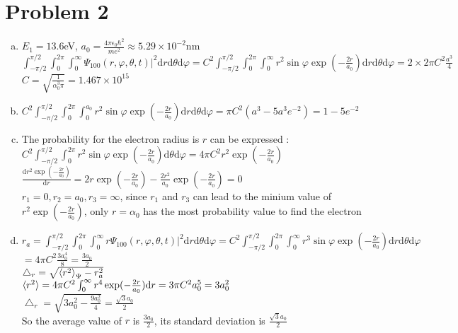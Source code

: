 \documentclass[a4paper]{article}
\begin{document}
\section{Problem 2}
\begin{enumerate}[(a)]
    \item $E_1=13.6$eV, $a_0=\frac{4\pi\epsilon_0\hbar^2}{me^2}\approx5.29\times10^{-2}$nm
    \\$\int_{-\pi/2}^{\pi/2}\int_0^{2\pi}\int_0^\infty\Psi_{100}(r,\varphi,\theta,t)|^2\mathrm{d}r\mathrm{d}\theta\mathrm{d}\varphi=C^2\int_{-\pi/2}^{\pi/2}\int_0^{2\pi}\int_0^\infty r^2\sin\varphi\exp(-\frac{2r}{a_0})\mathrm{d}r\mathrm{d}\theta\mathrm{d}\varphi=2\times2\pi C^2\frac{a^3}{4}$
    \\$C=\sqrt{\frac{1}{\alpha_0^3\pi}}=1.467\times10^{15}$
    \item $C^2\int_{-\pi/2}^{\pi/2}\int_0^{2\pi}\int_0^{a_0} r^2\sin\varphi\exp(-\frac{2r}{a_0})\mathrm{d}r\mathrm{d}\theta\mathrm{d}\varphi=\pi C^2(a^3-5a^3e^{-2})=1-5e^{-2}$
    \item The probability for the electron radius is $r$ can be expressed :
    \\$C^2\int_{-\pi/2}^{\pi/2}\int_0^{2\pi} r^2\sin\varphi\exp(-\frac{2r}{a_0})\mathrm{d}\theta\mathrm{d}\varphi=4\pi C^2r^2\exp(-\frac{2r}{a_0})$
    \\$\frac{\mathrm{d}r^2\exp(-\frac{2r}{a_0})}{\mathrm{d}r}=2r\exp(-\frac{2r}{a_0})-\frac{2r^2}{a_0}\exp(-\frac{2r}{a_0})=0$
    \\$r_1=0, r_2=a_0, r_3=\infty$, since $r_1$ and $r_3$ can lead to the minium value of $r^2\exp(-\frac{2r}{a_0})$, only $r=\alpha_0$ has the most probability value to find the electron
    \item $r_a=\int_{-\pi/2}^{\pi/2}\int_0^{2\pi}\int_0^\infty r\Psi_{100}(r,\varphi,\theta,t)|^2\mathrm{d}r\mathrm{d}\theta\mathrm{d}\varphi=C^2\int_{-\pi/2}^{\pi/2}\int_0^{2\pi}\int_0^\infty r^3\sin\varphi\exp(-\frac{2r}{a_0})\mathrm{d}r\mathrm{d}\theta\mathrm{d}\varphi$
    \\$=4\pi C^2\frac{3a_0^4}{8}=\frac{3a_0}{2}$
    \\$\bigtriangleup_r=\sqrt{\braket{r^2}_\Psi-r_a^2}$
    \\$\braket{r^2}=4\pi C^2\int_0^\infty r^4\exp(-\frac{2r}{a_0})\mathrm{d}r=3\pi C^2 a_0^5=3a_0^2$
    \\$\bigtriangleup_r=\sqrt{3a_0^2-\frac{9a_0^2}{4}}=\frac{\sqrt{3}a_0}{2}$
    \\So the average value of $r$ is $\frac{3a_0}{2}$, its standard deviation is $\frac{\sqrt{3}a_0}{2}$
\end{enumerate}
\end{document}
